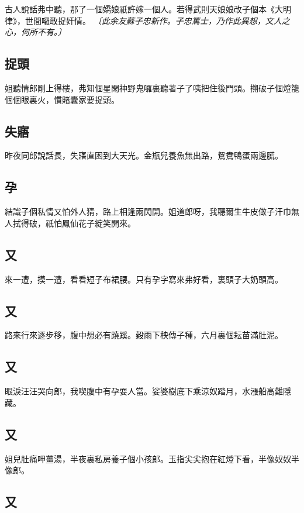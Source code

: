 古人說話弗中聽，那了一個嬌娘祇許嫁一個人。若得武則天娘娘改子個本《大明律》，世間囉敢捉奸情。
\textit{〔此余友蘇子忠新作。子忠篤士，乃作此異想，文人之心，何所不有。〕}

\subsection*{捉頭}

姐聽情郎剛上得樓，弗知個星閑神野鬼囉裏聽著子了咦把住後門頭。搠破子個燈籠個個眼裏火，慣賭囊家要捉頭。

\subsection*{失寤}

昨夜同郎說話長，失寤直困到大天光。金瓶兒養魚無出路，鴛鴦鴨蛋兩邊䐠。

\subsection*{孕}

結識子個私情又怕外人猜，路上相逢兩閃開。姐道郎呀，我聽爾生牛皮做子汗巾無人拭得破，祇怕鳳仙花子綻笑開來。

\subsection*{又}

來一遭，摸一遭，看看短子布裙腰。只有孕字寫來弗好看，裏頭子大奶頭高。

\subsection*{又}

路來行來逐步移，腹中想必有蹺蹊。穀雨下秧傳子種，六月裏個耘苗滿肚泥。

\subsection*{又}

眼淚汪汪哭向郎，我喫腹中有孕耍人當。娑婆樹底下乘涼奴踏月，水漲船高難隱藏。

\subsection*{又}

姐兒肚痛呷薑湯，半夜裏私房養子個小孩郎。玉指尖尖抱在紅燈下看，半像奴奴半像郎。

\subsection*{又}

